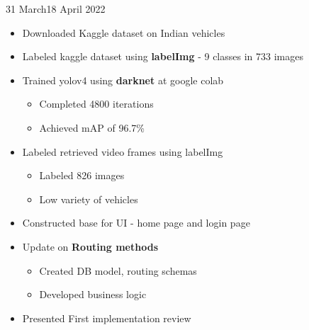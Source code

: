 \documentclass{diaryformat}
\begin{document}
\begin{workDone}{31 March}{18 April 2022}
	\begin{itemize}
		\item Downloaded Kaggle dataset on Indian vehicles
		\item Labeled kaggle dataset using \textbf{labelImg} - 9 classes in 733 images
		\item Trained yolov4 using \textbf{darknet} at google colab
		\begin{itemize}
			\item Completed 4800 iterations
			\item Achieved mAP of 96.7\%
		\end{itemize}
		\item Labeled retrieved video frames using labelImg
		\begin{itemize}
			\item Labeled 826 images
			\item Low variety of vehicles
		\end{itemize}
		\item Constructed base for UI - home page and login page
		\item Update on \textbf{Routing methods}
		\begin{itemize}
			\item Created DB model, routing schemas
			\item Developed business logic
		\end{itemize}		
		\item Presented First implementation review
	\end{itemize}
\end{workDone}
\end{document}
